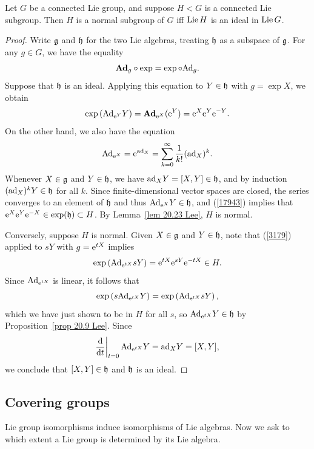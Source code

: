 \begin{thm}\label{thm 20.28 Lee}
    Let $G$ be a connected Lie group, and suppose $H<G$ is a connected Lie subgroup. Then $H$ is a normal subgroup of $G$ iff $\operatorname{Lie} H$ is an ideal in $\operatorname{Lie} G$.
\end{thm}
\begin{proof}
    Write $\mathfrak{g}$ and $\mathfrak{h}$ for the two Lie algebras, treating $\mathfrak{h}$ as a subspace of $\mathfrak{g}$. For any $g\in G$, we have the equality \[\mathrm{\mathbf{Ad}}_g\circ \exp=\exp\circ \mathrm{Ad}_g.\label{3179}\]
    Suppose that $\mathfrak{h}$ is an ideal. Applying this equation to $Y\in\mathfrak{h}$ with $g=\exp X$, we obtain
    \[\exp\left(\mathrm{Ad}_{\mathrm{e}^Y}Y\right)=\mathrm{\mathbf{Ad}}_{\mathrm{e}^X}(\mathrm{e}^Y)=\mathrm{e}^X \mathrm{e}^Y \mathrm{e}^{-Y}.\label{17943}\]
    On the other hand, we also have the equation
    \[\mathrm{Ad}_{\mathrm{e}^X}=\mathrm{e}^{\mathrm{ad}_X}=\sum_{k=0}^\infty \frac{1}{k!}(\mathrm{ad}_X)^k.\]
    Whenever $X\in\mathfrak{g}$ and $Y\in\mathfrak{h}$, we have $\mathrm{ad}_X Y=[X,Y]\in\mathfrak{h}$, and by induction $(\mathrm{ad}_X)^k Y\in \mathfrak{h}$ for all $k$. Since finite-dimensional vector spaces are closed, the series converges to an element of $\mathfrak{h}$ and thus $\mathrm{Ad}_{\mathrm{e}^X}Y\in\mathfrak{h}$, and (\ref{17943}) implies that $\mathrm{e}^X \mathrm{e}^Y \mathrm{e}^{-X}\in \exp (\mathfrak{h})\subset H $. By Lemma~\ref{lem 20.23 Lee}, $H$ is normal.

    Conversely, suppose $H$ is normal. Given $X\in\mathfrak{g}$ and $Y\in\mathfrak{h}$, note that (\ref{3179}) applied to $sY$ with $g=\mathrm{e}^{tX}$ implies
    \[\exp\left(\mathrm{Ad}_{\mathrm{e}^{tX}} sY\right)=\mathrm{e}^{tX}\mathrm{e}^{sY}\mathrm{e}^{-tX}\in H.\]
    Since $\mathrm{Ad}_{\mathrm{e}^{tX}}$ is linear, it follows that
    \[\exp\left(s\mathrm{Ad}_{\mathrm{e}^{tX}}Y\right)=\exp\left(\mathrm{Ad}_{\mathrm{e}^{tX}}sY\right),\]
    which we have just shown to be in $H$ for all $s$, so $\mathrm{Ad}_{\mathrm{e}^{tX}}Y\in\mathfrak{h}$ by Proposition~\ref{prop 20.9 Lee}. Since
    \[\restr{\frac{\dd}{\dd t}}{t=0}\Ad_{\rme^{tX}}Y=\ad_X Y=[X,Y],\]
    we conclude that $[X,Y]\in\mathfrak{h}$ and $\mathfrak{h}$ is an ideal.
\end{proof}









\subsection{Covering groups}


Lie group isomorphisms induce isomorphisms of Lie algebras. Now we ask to which extent a Lie group is determined by its Lie algebra.

